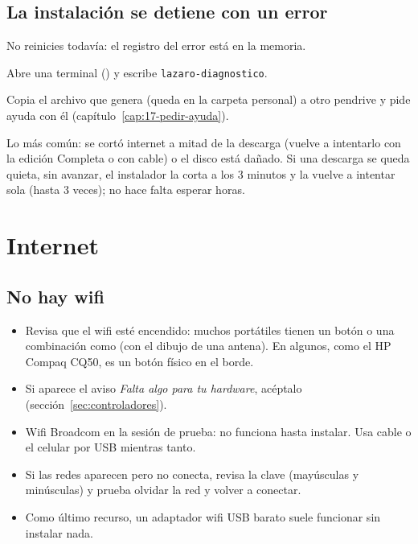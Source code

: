 \subsection{La instalación se detiene con un error}\label{sec:prob-instalacion}
\begin{pasos}
  \item No reinicies todavía: el registro del error está en la memoria.
  \item Abre una terminal () y
        escribe \texttt{lazaro-diagnostico}.
  \item Copia el archivo que genera (queda en la carpeta personal) a otro
        pendrive y pide ayuda con él (capítulo~\ref{cap:17-pedir-ayuda}).
\end{pasos}
Lo más común: se cortó internet a mitad de la descarga (vuelve a
intentarlo con la edición Completa o con cable) o el disco está dañado.
Si una descarga se queda quieta, sin avanzar, el instalador la corta a
los 3 minutos y la vuelve a intentar sola (hasta 3 veces); no hace falta
esperar horas.

\section{Internet}

\subsection{No hay wifi}\label{sec:prob-wifi}
\begin{itemize}
  \item Revisa que el wifi esté encendido: muchos portátiles tienen un
        botón o una combinación como  (con el dibujo de una
        antena). En algunos, como el HP Compaq CQ50, es un botón físico
        en el borde.
  \item Si aparece el aviso \emph{Falta algo para tu hardware}, acéptalo
        (sección~\ref{sec:controladores}).
  \item Wifi Broadcom en la sesión de prueba: no funciona hasta instalar.
        Usa cable o el celular por USB mientras tanto.
  \item Si las redes aparecen pero no conecta, revisa la clave (mayúsculas
        y minúsculas) y prueba olvidar la red y volver a conectar.
  \item Como último recurso, un adaptador wifi USB barato suele funcionar
        sin instalar nada.
\end{itemize}

